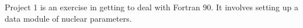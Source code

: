 Project 1 is an exercise in getting to deal with Fortran 90. It involves setting up a data module of nuclear parameters. 